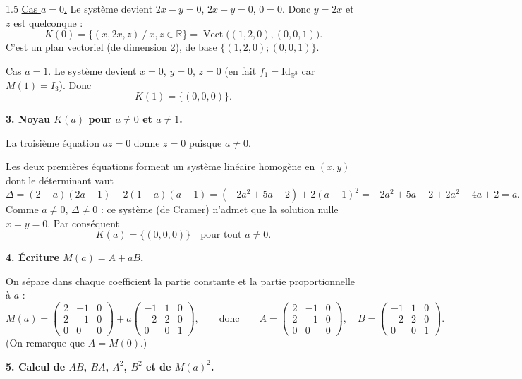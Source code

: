\documentclass[12pt]{article}
\begin{document}
\begin{spacing}{1.5}
\underline{Cas $a=0$.} Le système devient $2x-y=0$, $2x-y=0$, $0=0$. Donc $y=2x$ et $z$ est quelconque :
\[
K(0)=\{(x,2x,z)\ /\ x,z\in\mathbb{R}\}=\operatorname{Vect}\big((1,2,0),(0,0,1)\big).
\]
C'est un plan vectoriel (de dimension 2), de base $\{(1,2,0);(0,0,1)\}$.

\underline{Cas $a=1$.} Le système devient $x=0$, $y=0$, $z=0$ (en fait $f_1=\mathrm{Id}_{\mathbb{R}^3}$ car $M(1)=I_3$). Donc
\[
K(1)=\{(0,0,0)\}.
\]

\textbf{3. Noyau $K(a)$ pour $a\neq0$ et $a\neq1$.}

La troisième équation $az=0$ donne $z=0$ puisque $a\neq 0$.

Les deux premières équations forment un système linéaire homogène en $(x,y)$ dont le déterminant vaut
\[
\Delta=(2-a)(2a-1)-2(1-a)(a-1)=(-2a^2+5a-2)+2(a-1)^2=-2a^2+5a-2+2a^2-4a+2=a .
\]
Comme $a\neq 0$, $\Delta\neq 0$ : ce système (de Cramer) n'admet que la solution nulle $x=y=0$. Par conséquent
\[
K(a)=\{(0,0,0)\}\quad\text{pour tout } a\neq 0 .
\]

\textbf{4. Écriture $M(a)=A+aB$.}

On sépare dans chaque coefficient la partie constante et la partie proportionnelle à $a$ :
\[
M(a)=\begin{pmatrix}
2 & -1 & 0 \\
2 & -1 & 0 \\
0 & 0 & 0
\end{pmatrix}
+a\begin{pmatrix}
-1 & 1 & 0 \\
-2 & 2 & 0 \\
0 & 0 & 1
\end{pmatrix},
\qquad\text{donc}\qquad
A=\begin{pmatrix}
2 & -1 & 0 \\
2 & -1 & 0 \\
0 & 0 & 0
\end{pmatrix},\quad
B=\begin{pmatrix}
-1 & 1 & 0 \\
-2 & 2 & 0 \\
0 & 0 & 1
\end{pmatrix}.
\]
(On remarque que $A=M(0)$.)

\textbf{5. Calcul de $AB$, $BA$, $A^2$, $B^2$ et de $M(a)^2$.}


\end{spacing}
\end{document}
